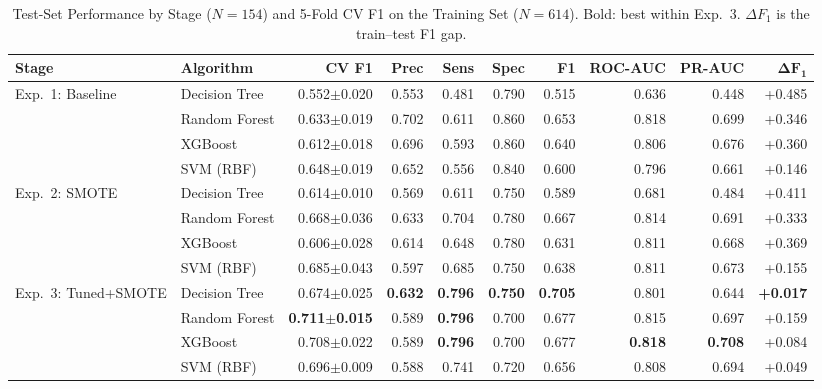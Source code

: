 \documentclass[journal]{IEEEtran}
\begin{document}
\begin{table}[t]
\centering
\caption{Test-Set Performance by Stage ($N = 154$) and 5-Fold CV F1 on the Training Set ($N = 614$). Bold: best within Exp.~3. $\Delta F_1$ is the train--test F1 gap.}
\label{tab:main_results}
\footnotesize
\begin{tabular}{llrrrrrrrr}
\toprule
\textbf{Stage} & \textbf{Algorithm} & \textbf{CV F1} & \textbf{Prec} & \textbf{Sens} & \textbf{Spec} & \textbf{F1} & \textbf{ROC-AUC} & \textbf{PR-AUC} & $\boldsymbol{\Delta F_1}$ \\
\midrule
\multirow{4}{*}{Exp.~1: Baseline} & Decision Tree & 0.552$\pm$0.020 & 0.553 & 0.481 & 0.790 & 0.515 & 0.636 & 0.448 & +0.485 \\
 & Random Forest & 0.633$\pm$0.019 & 0.702 & 0.611 & 0.860 & 0.653 & 0.818 & 0.699 & +0.346 \\
 & XGBoost & 0.612$\pm$0.018 & 0.696 & 0.593 & 0.860 & 0.640 & 0.806 & 0.676 & +0.360 \\
 & SVM (RBF) & 0.648$\pm$0.019 & 0.652 & 0.556 & 0.840 & 0.600 & 0.796 & 0.661 & +0.146 \\
\midrule
\multirow{4}{*}{Exp.~2: SMOTE} & Decision Tree & 0.614$\pm$0.010 & 0.569 & 0.611 & 0.750 & 0.589 & 0.681 & 0.484 & +0.411 \\
 & Random Forest & 0.668$\pm$0.036 & 0.633 & 0.704 & 0.780 & 0.667 & 0.814 & 0.691 & +0.333 \\
 & XGBoost & 0.606$\pm$0.028 & 0.614 & 0.648 & 0.780 & 0.631 & 0.811 & 0.668 & +0.369 \\
 & SVM (RBF) & 0.685$\pm$0.043 & 0.597 & 0.685 & 0.750 & 0.638 & 0.811 & 0.673 & +0.155 \\
\midrule
\multirow{4}{*}{Exp.~3: Tuned+SMOTE} & Decision Tree & 0.674$\pm$0.025 & \textbf{0.632} & \textbf{0.796} & \textbf{0.750} & \textbf{0.705} & 0.801 & 0.644 & \textbf{+0.017} \\
 & Random Forest & \textbf{0.711$\pm$0.015} & 0.589 & \textbf{0.796} & 0.700 & 0.677 & 0.815 & 0.697 & +0.159 \\
 & XGBoost & 0.708$\pm$0.022 & 0.589 & \textbf{0.796} & 0.700 & 0.677 & \textbf{0.818} & \textbf{0.708} & +0.084 \\
 & SVM (RBF) & 0.696$\pm$0.009 & 0.588 & 0.741 & 0.720 & 0.656 & 0.808 & 0.694 & +0.049 \\
\bottomrule
\end{tabular}
\end{table}
\end{document}
